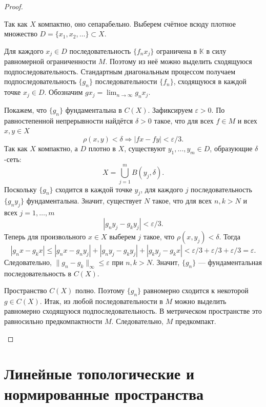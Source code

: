 \begin{proof}
\begin{enumerate}
        Так как \(X\) компактно, оно сепарабельно. Выберем счётное всюду плотное множество \(D=\{x_1,x_2,\dots\}\subset X\).

        Для каждого \(x_j\in D\) последовательность \(\{f_n x_j\}\) ограничена в \(\mathbb K\) в силу равномерной ограниченности \(M\). Поэтому из неё можно выделить сходящуюся подпоследовательность. Стандартным диагональным процессом получаем подпоследовательность \(\{g_n\}\) последовательности \(\{f_n\}\), сходящуюся в каждой точке \(x_j\in D\). Обозначим \(g x_j=\lim_{n\to\infty} g_n x_j\).

        Покажем, что \(\{g_n\}\) фундаментальна в \(C(X)\). Зафиксируем \(\varepsilon>0\). По равностепенной непрерывности найдётся \(\delta>0\) такое, что для всех \(f\in M\) и всех \(x,y\in X\)
        \[
            \rho(x,y)<\delta\Rightarrow |fx-fy|<\varepsilon/3.
        \]
        Так как \(X\) компактно, а \(D\) плотно в \(X\), существуют \(y_1,\dots,y_m\in D\), образующие \(\delta\)-сеть:
        \[
            X=\bigcup_{j=1}^m B(y_j,\delta).
        \]
        Поскольку \(\{g_n\}\) сходится в каждой точке \(y_j\), для каждого \(j\) последовательность \(\{g_n y_j\}\) фундаментальна. Значит, существует \(N\) такое, что для всех \(n,k>N\) и всех \(j=1,\dots,m\)
        \[
            |g_n y_j-g_k y_j|<\varepsilon/3.
        \]
        Теперь для произвольного \(x\in X\) выберем \(j\) такое, что \(\rho(x,y_j)<\delta\). Тогда
        \[
            |g_n x-g_k x|
            \le |g_n x-g_n y_j|+|g_n y_j-g_k y_j|+|g_k y_j-g_k x|
            <\varepsilon/3+\varepsilon/3+\varepsilon/3=\varepsilon.
        \]
        Следовательно, \(\|g_n-g_k\|_\infty\le\varepsilon\) при \(n,k>N\). Значит, \(\{g_n\}\) — фундаментальная последовательность в \(C(X)\).

        Пространство \(C(X)\) полно. Поэтому \(\{g_n\}\) равномерно сходится к некоторой \(g\in C(X)\). Итак, из любой последовательности в \(M\) можно выделить равномерно сходящуюся подпоследовательность. В метрическом пространстве это равносильно предкомпактности \(M\). Следовательно, \(M\) предкомпакт.
    \end{enumerate}
\end{proof}

\section{Линейные топологические и нормированные пространства}

